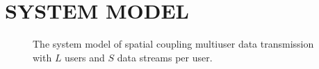 \documentclass[conference]{IEEEtran}
\begin{document}
\section{SYSTEM MODEL}
\begin{figure}[ht]
\setlength{\abovecaptionskip}{0.cm}
\setlength{\belowcaptionskip}{-0.cm}
  \caption{The system model of spatial coupling multiuser data transmission with $L$ users and $S$ data streams per user.}\label{fig.1}
    \vspace{-2em}
\end{figure}
\end{document}
